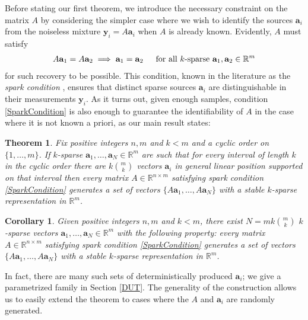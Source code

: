 \documentclass[journal, onecolumn]{IEEEtran}
\newtheorem{theorem}{Theorem}
\newtheorem{corollary}{Corollary}
\begin{document}
Before stating our first theorem, we introduce the necessary constraint on the matrix $A$ by considering the simpler case where we wish to identify the sources $\mathbf{a}_i$ from the noiseless mixture $\mathbf{y}_i = A\mathbf{a}_i$ when $A$ is already known. Evidently, $A$ must satisfy
\begin{align}\label{SparkCondition}
A\mathbf{a}_1 = A\mathbf{a}_2 \implies \mathbf{a}_1 = \mathbf{a}_2 \indent \text{for all $k$-sparse } \mathbf{a}_1, \mathbf{a}_2 \in \mathbb{R}^m
\end{align}
%
for such recovery to be possible. This condition, known in the literature as the \emph{spark condition} \cite{ref?}, ensures that distinct sparse sources $\mathbf{a}_i$ are distinguishable in their measurements $\mathbf{y}_i$. As it turns out, given enough samples, condition \eqref{SparkCondition} is also enough to guarantee the identifiability of $A$ in the case where it is not known a priori, as our main result states:


\begin{theorem}\label{DeterministicUniquenessTheorem}
Fix positive integers $n, m$ and $k < m$ and a cyclic order on $\{1, \ldots, m\}$. If $k$-sparse $\mathbf{a}_1, \ldots, \mathbf{a}_N \in \mathbb{R}^m$ are such that for every interval of length $k$ in the cyclic order there are $k{m \choose k}$ vectors $\mathbf{a}_i$ in general linear position supported on that interval then every matrix $A \in \mathbb{R}^{n \times m}$ satisfying spark condition \eqref{SparkCondition} generates a set of vectors $\{A\mathbf{a}_1, \ldots, A\mathbf{a}_N\}$ with a stable $k$-sparse representation in $\mathbb{R}^m$.
\end{theorem}

\begin{corollary}\label{DeterministicUniquenessTheorem}
Given positive integers $n, m$ and $k < m$, there exist $N =  mk{m \choose k}$ $k$-sparse vectors $\mathbf{a}_1, \ldots, \mathbf{a}_N \in \mathbb{R}^m$ with the following property: every matrix $A \in \mathbb{R}^{n \times m}$ satisfying spark condition \eqref{SparkCondition} generates a set of vectors $\{A\mathbf{a}_1, \ldots, A\mathbf{a}_N\}$ with a stable $k$-sparse representation in $\mathbb{R}^m$.
\end{corollary}

In fact, there are many such sets of deterministically produced $\mathbf{a}_i$; we give a parametrized family in Section \ref{DUT}. The generality of the construction allows us to easily extend the theorem to cases where the $A$ and $\mathbf{a}_i$ are randomly generated.
\end{document}
